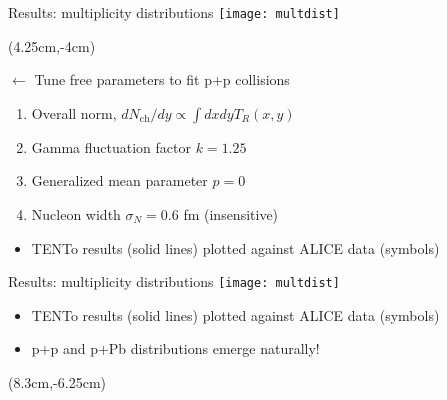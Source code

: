 \documentclass[svgnames]{beamer}
\newcommand{\trento}{T\raisebox{-.5ex}{R}ENTo}
\begin{document}
\begin{frame}[t]{Results: multiplicity distributions}
 \vspace{0.2 in}
 \setlength{\leftmargini}{30pt}
 \texttt{[image: multdist]}
 
 \begin{textblock*}{0.65\textwidth}(4.25cm,-4cm)
  \vspace{0.2 in}
  
  {\hspace{-0.1 in} \large $\leftarrow$ Tune free parameters to fit p+p collisions}\\
  \begin{enumerate}
   \normalsize
   \item Overall norm, $dN_\text{ch}/dy \propto \int dx dy T_R(x,y)$
   \item Gamma fluctuation factor $k=1.25$
   \item Generalized mean parameter $p=0$
   \item Nucleon width $\sigma_N=0.6$ fm (insensitive)
  \end{enumerate}
 
 \vspace{1.25 in}
 \end{textblock*}
 
 \begin{itemize}
  \item {\trento} results (solid lines) plotted against ALICE data (symbols)
 \end{itemize}
\end{frame}

\begin{frame}[t,noframenumbering]{Results: multiplicity distributions}
 \vspace{0.2 in}
 \texttt{[image: multdist]}
 \begin{itemize}
  \item {\trento} results (solid lines) plotted against ALICE data (symbols)
  \vspace{0.05 in}
  \item p+p and p+Pb distributions emerge naturally!
 \end{itemize}
 
  \hspace{4 in}
 \begin{textblock*}{0.33\textwidth}(8.3cm,-6.25cm)
 ~\vspace{1.75 in}
 \end{textblock*}
\end{frame}
\end{document}
